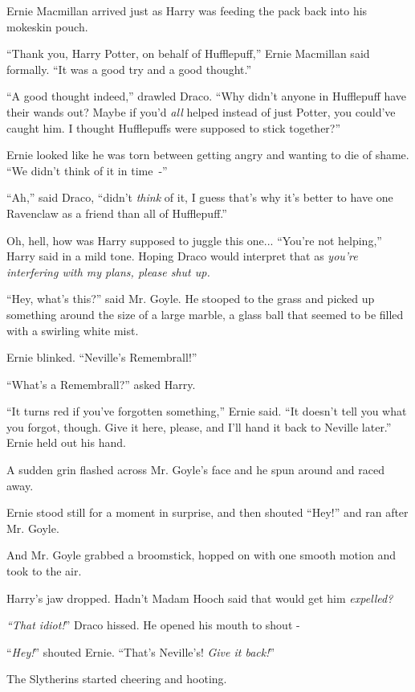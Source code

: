 Ernie Macmillan arrived just as Harry was feeding the pack back into his mokeskin pouch.

``Thank you, Harry Potter, on behalf of Hufflepuff,'' Ernie Macmillan said formally. ``It was a good try and a good thought.''

``A good thought indeed,'' drawled Draco. ``Why didn't anyone in Hufflepuff have their wands out? Maybe if you'd \emph{all} helped instead of just Potter, you could've caught him. I thought Hufflepuffs were supposed to stick together?''

Ernie looked like he was torn between getting angry and wanting to die of shame. ``We didn't think of it in time~-''

``Ah,'' said Draco, ``didn't \emph{think} of it, I guess that's why it's better to have one Ravenclaw as a friend than all of Hufflepuff.''

Oh, hell, how was Harry supposed to juggle this one... ``You're not helping,'' Harry said in a mild tone. Hoping Draco would interpret that as \emph{you're interfering with my plans, please shut up.}

``Hey, what's this?'' said Mr. Goyle. He stooped to the grass and picked up something around the size of a large marble, a glass ball that seemed to be filled with a swirling white mist.

Ernie blinked. ``Neville's Remembrall!''

``What's a Remembrall?'' asked Harry.

``It turns red if you've forgotten something,'' Ernie said. ``It doesn't tell you what you forgot, though. Give it here, please, and I'll hand it back to Neville later.'' Ernie held out his hand.

A sudden grin flashed across Mr. Goyle's face and he spun around and raced away.

Ernie stood still for a moment in surprise, and then shouted ``Hey!'' and ran after Mr. Goyle.

And Mr. Goyle grabbed a broomstick, hopped on with one smooth motion and took to the air.

Harry's jaw dropped. Hadn't Madam Hooch said that would get him \emph{expelled?}

\emph{``That idiot!}'' Draco hissed. He opened his mouth to shout -

``\emph{Hey!}'' shouted Ernie. ``That's Neville's! \emph{Give it back!}''

The Slytherins started cheering and hooting.

